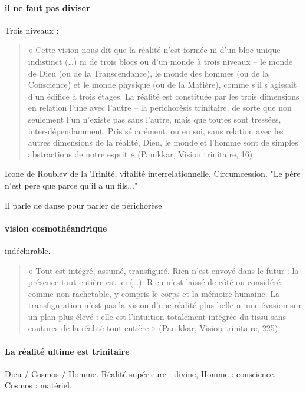  \paragraph{il ne faut pas diviser} Trois niveaux : 

 \begin{quote}
« Cette vision nous dit que la réalité n’est formée ni d’un bloc unique indistinct (…) ni de trois 
blocs ou d’un monde à trois niveaux – le monde de Dieu (ou de la Transcendance), le monde des 
hommes (ou de la Conscience) et le monde physique (ou de la Matière), comme s’il s’agissait d’un 
édifice à trois étages. La réalité est constituée par les trois dimensions en relation l’une avec 
l’autre – la perichorèsis trinitaire, de sorte que non seulement l’un n’existe pas sans l’autre, 
mais que toutes sont tressées, inter-dépendamment. Pris séparément, ou en soi, sans relation avec 
les autres dimensions de la réalité, Dieu, le monde et l’homme sont de simples abstractions de 
notre esprit » (Panikkar, Vision trinitaire, 16).

\end{quote}

\begin{Def}[périchorèse]
    Icone de Roublev de la Trinité, vitalité interrelationnelle.
    Circumcession. "Le père n'est père que parce qu'il a un fils..."
\end{Def}

\begin{Prop}
    Il parle de danse pour parler de périchorèse
\end{Prop}

\paragraph{vision cosmothéandrique} indéchirable. 


\begin{quote}
« Tout est intégré, assumé, transfiguré. Rien n’est envoyé dans le futur : la présence tout entière 
est ici (…). Rien n’est laissé de côté ou considéré comme non rachetable, y compris le corps et la 
mémoire humaine. La transfiguration n’est pas la vision d’une réalité plus belle ni une évasion sur 
un plan plus élevé : elle est l’intuition totalement intégrée du tissu sans coutures de la réalité 
tout entière » (Panikkar, Vision trinitaire, 225).
\end{quote}

\paragraph{La réalité ultime est trinitaire} Dieu / Cosmos / Homme. Réalité supérieure : divine, Homme : conscience. Cosmos : matériel. 


